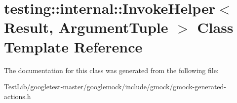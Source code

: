 \hypertarget{classtesting_1_1internal_1_1InvokeHelper}{}\section{testing\+:\+:internal\+:\+:Invoke\+Helper$<$ Result, Argument\+Tuple $>$ Class Template Reference}
\label{classtesting_1_1internal_1_1InvokeHelper}


The documentation for this class was generated from the following file\+:\begin{DoxyCompactItemize}
\item 
Test\+Lib/googletest-\/master/googlemock/include/gmock/gmock-\/generated-\/actions.\+h\end{DoxyCompactItemize}
